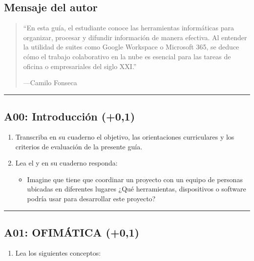 \documentclass[letterpaper,10pt,spanish]{sphinxmanual}
\begin{document}
\subsection{Mensaje del autor}
\label{\detokenize{1_guias/10ofimatica/G1011:mensaje-del-autor}}\begin{quote}

\sphinxAtStartPar
“En esta guía, el estudiante conoce las herramientas informáticas para organizar, procesar y difundir información de manera efectiva. Al entender la utilidad de suites como Google Workspace o Microsoft 365, se deduce cómo el trabajo colaborativo en la nube es esencial para las tareas de oficina o empresariales del siglo XXI.”

\begin{flushright}
---Camilo Fonseca
\end{flushright}
\end{quote}


\bigskip\hrule\bigskip



\subsection{A00: Introducción (+0,1)}
\label{\detokenize{1_guias/10ofimatica/G1011:a00-introduccion-0-1}}
\sphinxAtStartPar
{}
\begin{enumerate}
%
\item {} 
\sphinxAtStartPar
Transcriba en su cuaderno el objetivo, las orientaciones curriculares y los criterios de evaluación de la presente guía.

\item {} 
\sphinxAtStartPar
Lea el  y en su cuaderno responda:
\begin{itemize}
\item {} 
\sphinxAtStartPar
Imagine que tiene que coordinar un proyecto con un equipo de personas ubicadas en diferentes lugares ¿Qué herramientas, dispositivos o software podría usar para desarrollar este proyecto?

\end{itemize}

\end{enumerate}


\bigskip\hrule\bigskip



\subsection{A01: OFIMÁTICA (+0,1)}
\label{\detokenize{1_guias/10ofimatica/G1011:a01-ofimatica-0-1}}
\sphinxAtStartPar
{}
\begin{enumerate}
%
\item {} 
\sphinxAtStartPar
Lea los siguientes conceptos:

\end{enumerate}
\end{document}
